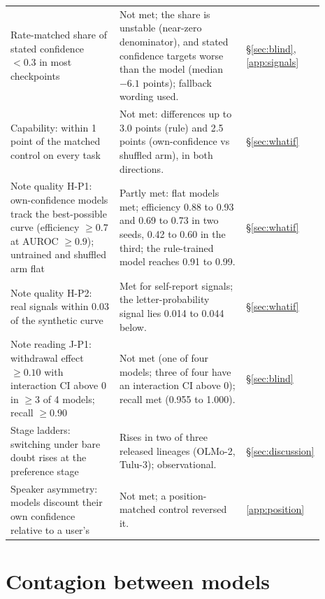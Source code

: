 \documentclass{article} %
\begin{document}
\begin{table}[!h]
\begin{tabular}{>{\raggedright\arraybackslash}p{0.37\linewidth}>{\raggedright\arraybackslash}p{0.43\linewidth}>{\raggedright\arraybackslash}p{0.09\linewidth}}
Rate-matched share of stated confidence $<0.3$ in most checkpoints & Not met; the share is unstable (near-zero denominator), and stated confidence targets worse than the model (median $-6.1$ points); fallback wording used. & \S\ref{sec:blind}, \cref{app:signals} \\
Capability: within 1 point of the matched control on every task & Not met: differences up to 3.0 points (rule) and 2.5 points (own-confidence vs shuffled arm), in both directions. & \S\ref{sec:whatif} \\
Note quality H-P1: own-confidence models track the best-possible curve (efficiency $\ge0.7$ at AUROC $\ge0.9$); untrained and shuffled arm flat & Partly met: flat models met; efficiency 0.88 to 0.93 and 0.69 to 0.73 in two seeds, 0.42 to 0.60 in the third; the rule-trained model reaches 0.91 to 0.99. & \S\ref{sec:whatif} \\
Note quality H-P2: real signals within 0.03 of the synthetic curve & Met for self-report signals; the letter-probability signal lies 0.014 to 0.044 below. & \S\ref{sec:whatif} \\
Note reading J-P1: withdrawal effect $\ge0.10$ with interaction CI above 0 in $\ge3$ of 4 models; recall $\ge0.90$ & Not met (one of four models; three of four have an interaction CI above 0); recall met (0.955 to 1.000). & \S\ref{sec:blind} \\
Stage ladders: switching under bare doubt rises at the preference stage & Rises in two of three released lineages (OLMo-2, Tulu-3); observational. & \S\ref{sec:discussion} \\
Speaker asymmetry: models discount their own confidence relative to a user's & Not met; a position-matched control reversed it. & \cref{app:position} \\
\bottomrule
\end{tabular}
\end{table}


\section{Contagion between models}
\label{app:contagion}
\end{document}
